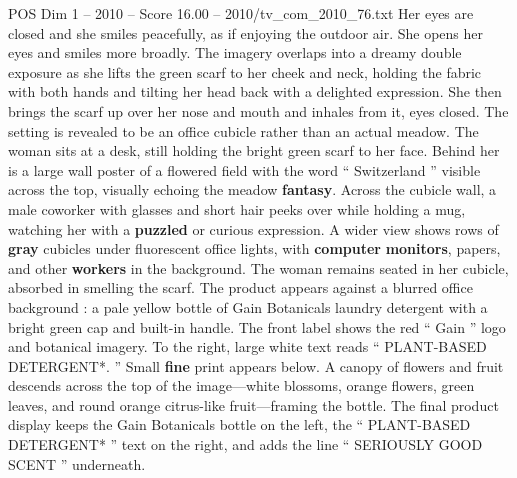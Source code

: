 \begin{textsample}{POS Dim 1 – 2010 – Score 16.00 – 2010/tv\_com\_2010\_76.txt}
Her eyes are closed and she smiles peacefully, as if enjoying the outdoor air.
She opens her eyes and smiles more broadly.
The imagery overlaps into a dreamy double exposure as she lifts the green scarf to her cheek and neck, holding the fabric with both hands and tilting her head back with a delighted expression.
She then brings the scarf up over her nose and mouth and inhales from it, eyes closed.
The setting is revealed to be an office cubicle rather than an actual meadow.
The woman sits at a desk, still holding the bright green scarf to her face.
Behind her is a large wall poster of a flowered field with the word “ Switzerland ” visible across the top, visually echoing the meadow \textbf{fantasy}.
Across the cubicle wall, a male coworker with glasses and short hair peeks over while holding a mug, watching her with a \textbf{puzzled} or curious expression.
A wider view shows rows of \textbf{gray} cubicles under fluorescent office lights, with \textbf{computer} \textbf{monitors}, papers, and other \textbf{workers} in the background.
The woman remains seated in her cubicle, absorbed in smelling the scarf.
The product appears against a blurred office background : a pale yellow bottle of Gain Botanicals laundry detergent with a bright green cap and built-in handle.
The front label shows the red “ Gain ” logo and botanical imagery.
To the right, large white text reads “ PLANT-BASED DETERGENT*. ” Small \textbf{fine} print appears below.
A canopy of flowers and fruit descends across the top of the image—white blossoms, orange flowers, green leaves, and round orange citrus-like fruit—framing the bottle.
The final product display keeps the Gain Botanicals bottle on the left, the “ PLANT-BASED DETERGENT* ” text on the right, and adds the line “ SERIOUSLY GOOD SCENT ” underneath.

\end{textsample}
